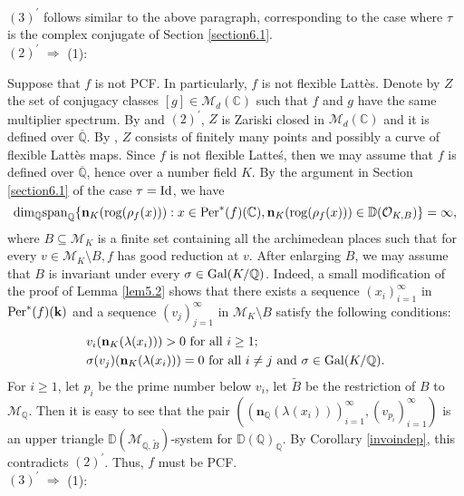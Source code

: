 \documentclass[12pt]{amsart}
\theoremstyle{plain}
\theoremstyle{remark}
\theoremstyle{definition}
\def\Q{\mathbb Q}
\def\C{\mathbb C}
\def\D{\mathbb D}
\def\rog{{\rm rog}}
\begin{document}
$(3)^\prime$ follows similar to the above paragraph, corresponding to the case where $\tau$ is the complex conjugate of Section \ref{section6.1}.\\
$(2)^\prime$ $\Rightarrow$ (1):\par
Suppose that $f$ is not PCF. In particularly, $f$ is not flexible Latt\`es. Denote by $Z$ the set of conjugacy classes $[g]\in\mathcal{M}_d(\C)$ such that $f$ and $g$ have the same multiplier spectrum. By \cite[Theorem 4.5]{Silverman1998} and $(2)^\prime$, $Z$ is Zariski closed in $\mathcal{M}_d(\C)$ and it is defined over $\overline{\Q}$. By \cite[Corollary 2.3]{McMullen1987}, $Z$ consists of finitely many points and possibly a curve of flexible Latt\`es maps. Since $f$ is not flexible Latte\'s, then we may assume that $f$ is defined over $\overline{\Q}$, hence over a number field $K$. By the argument in Section \ref{section6.1} of the case $\tau={\rm Id}$, we have \begin{equation*}{\rm dim}_{\Q}{\rm span}_\Q\{\mathbf{n}_{K}(\rog(\rho_f(x))):x\in{\rm Per}^*(f)(\C),\mathbf{n}_K(\rog(\rho_f(x)))\in\D(\mathcal{O}_{K,B})\}=\infty,
\end{equation*}where $B\subseteq\mathcal{M}_K$ is a finite set containing all the archimedean places such that for every $v \in \mathcal{M}_K \setminus B, f$ has good reduction at $v$. After enlarging $B$, we may assume that $B$ is invariant under every $\sigma\in{\rm Gal}(K/\Q)$. Indeed, a small modification of the proof of Lemma \ref{lem5.2} shows that there exists a sequence $(x_{i})_{i=1}^\infty$ in ${\rm Per}^*(f)(\mathbf{k})$ and a sequence $(v_{j})_{j=1}^\infty$ in $\mathcal{M}_{K} \setminus B$ satisfy the following conditions:\begin{align*}&v_i(\mathbf{n}_K(\lambda(x_i)))>0\text{ for all }i\geq1;\\
&\sigma(v_j)(\mathbf{n}_K(\lambda(x_i)))=0\text{ for all }i\neq j\text{ and }\sigma\in{\rm Gal}(K/\Q).
\end{align*}For $i\geq1$, let $p_i$ be the prime number below $v_i$, let $\widetilde{B}$ be the restriction of $B$ to $\mathcal{M}_{\Q}$.
Then it is easy to see that the pair $((\mathbf{n}_{\Q}(\lambda(x_{i})))_{i=1}^\infty,(v_{p_i})_{i=1}^\infty)$ is an upper triangle $\D(\mathcal{M}_{\Q,\widetilde{B}})$-system for $\D(\Q)_{\Q}$. By Corollary \ref{invoindep}, this contradicts $(2)^\prime$. Thus, $f$ must be PCF.\\
$(3)^\prime$ $\Rightarrow$ (1):\par
\end{document}

